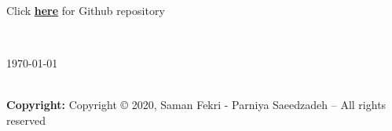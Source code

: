 \begin{titlepage}
	\vfill %
    \begin{minipage}{0.5\textwidth}
        \begin{flushleft}
        Click \textbf{\href{https://github.com/SamanFekri/SE2}{here}} for Github repository \\[0.7cm]
        \end{flushleft}
    \end{minipage}
    ~
    \begin{minipage}{0.3\textwidth}
        \begin{flushright}
            {\large\today}
        \end{flushright}
    \end{minipage}
	\\[0.5cm] %
	\textbf{Copyright:} Copyright © 2020, Saman Fekri - Parniya Saeedzadeh – All rights reserved\\[0.5cm]
\end{titlepage}